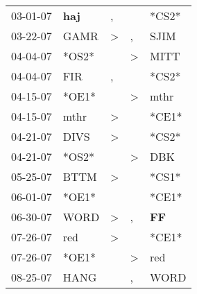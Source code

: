 \begin{supertabular}{p{0.07\textwidth}p{0.06\textwidth}p{0.02\textwidth}p{0.02\textwidth}p{0.06\textwidth}}
          03-01-07\textsuperscript{} &   \textbf{haj\textsuperscript{}} &                , &                  &                            *CS2* \\
          03-22-07\textsuperscript{} &           GAMR\textsuperscript{} &     \textgreater &                , &           SJIM\textsuperscript{} \\
          04-04-07\textsuperscript{} &                            *OS2* &                  &     \textgreater &           MITT\textsuperscript{} \\
          04-04-07\textsuperscript{} &            FIR\textsuperscript{} &                , &                  &                            *CS2* \\
          04-15-07\textsuperscript{} &                            *OE1* &                  &     \textgreater &           mthr\textsuperscript{} \\
          04-15-07\textsuperscript{} &           mthr\textsuperscript{} &     \textgreater &                  &                            *CE1* \\
          04-21-07\textsuperscript{} &           DIVS\textsuperscript{} &     \textgreater &                  &                            *CS2* \\
          04-21-07\textsuperscript{} &                            *OS2* &                  &     \textgreater &            DBK\textsuperscript{} \\
          05-25-07\textsuperscript{} &           BTTM\textsuperscript{} &     \textgreater &                  &                            *CS1* \\
          06-01-07\textsuperscript{} &                            *OE1* &                  &                  &                            *CE1* \\
          06-30-07\textsuperscript{} &           WORD\textsuperscript{} &     \textgreater &                , &    \textbf{FF\textsuperscript{}} \\
          07-26-07\textsuperscript{} &            red\textsuperscript{} &     \textgreater &                  &                            *CE1* \\
          07-26-07\textsuperscript{} &                            *OE1* &                  &     \textgreater &            red\textsuperscript{} \\
          08-25-07\textsuperscript{} &           HANG\textsuperscript{} &                  &                , &           WORD\textsuperscript{} \\

\end{supertabular}
